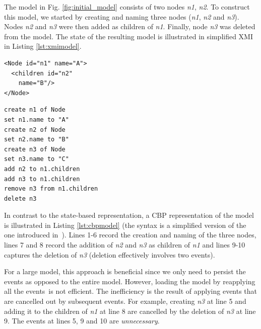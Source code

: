 \documentclass{llncs}
\begin{document}
The model in Fig. \ref{fig:initial_model} consists of two nodes \emph{n1}, \emph{n2}. To construct this model, we started by creating and naming three nodes (\emph{n1}, \emph{n2} and \emph{n3}). Nodes \emph{n2} and \emph{n3} were then added as children of \emph{n1}. Finally, node \emph{n3} was deleted from the model. The state of the resulting model is illustrated in simplified XMI in Listing \ref{lst:xmimodel}.

\noindent
\begin{minipage}[t]{0.34\linewidth}
\begin{lstlisting}[style=xmi,caption={State-based representation of the tree model in (simplified) XMI.},label=lst:xmimodel]
<Node id="n1" name="A">
  <children id="n2" 
    name="B"/>
</Node>
\end{lstlisting}
\end{minipage}
\hfill
\begin{minipage}[t]{0.635\linewidth}
\begin{lstlisting}[style=eol,caption={Change-based representation of the tree model.},label=lst:cbpmodel]
create n1 of Node
set n1.name to "A"      
create n2 of Node
set n2.name to "B"      
create n3 of Node
set n3.name to "C"      
add n2 to n1.children   
add n3 to n1.children
remove n3 from n1.children   
delete n3
\end{lstlisting}
\end{minipage}

In contrast to the state-based representation, a CBP representation of the model is illustrated in Listing \ref{lst:cbpmodel} (the syntax is a simplified version of the one introduced in\,\cite{yohannis2017turning} ).
Lines 1-6 record the creation and naming of the three nodes, lines 7 and 8 record the addition of \emph{n2} and \emph{n3} as children of \emph{n1} and lines 9-10 captures the deletion of \emph{n3} (deletion effectively involves two events).


For a large model, this approach is beneficial since we only need to persist the events as opposed to the entire model.
However, loading the model by reapplying all the events\,\cite{yohannis2017turning}  is not efficient.
The inefficiency is the result of applying events that are cancelled out by subsequent events.
For example,  creating \emph{n3} at line 5 and adding it to the children of \emph{n1} at line 8 are cancelled by the deletion of \emph{n3} at line 9.
The events at lines 5, 9 and 10 are \emph{unnecessary}.
\end{document}
